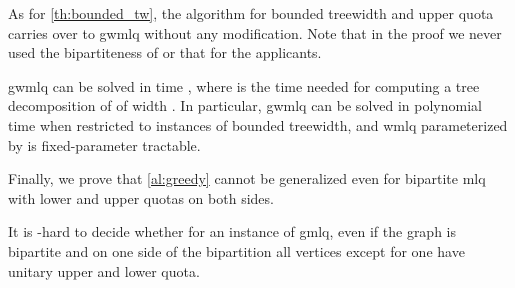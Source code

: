 \documentclass{llncs}
\begin{document}
As for \cref{th:bounded_tw}, the algorithm for bounded treewidth and upper quota carries over to {\sc gwmlq} without any modification. Note that in the proof we never used the bipartiteness of  or that  for the applicants.

\begin{theorem}
	  {\sc gwmlq} can be solved in time , where  is the time needed for computing a tree decomposition of  of width . In particular, {\sc gwmlq} can be solved in polynomial time when restricted to instances of bounded treewidth, and {\sc wmlq} parameterized by  is fixed-parameter tractable.
\end{theorem}

	Finally, we prove that \cref{al:greedy} cannot be generalized even for bipartite {\sc mlq} with lower and upper quotas on both sides.

\begin{theorem}
	It is -hard to decide whether  for an instance of {\sc gmlq}, even if the graph is bipartite and on one side of the bipartition all vertices except for one have unitary upper and lower quota.
\end{theorem}
\end{document}
